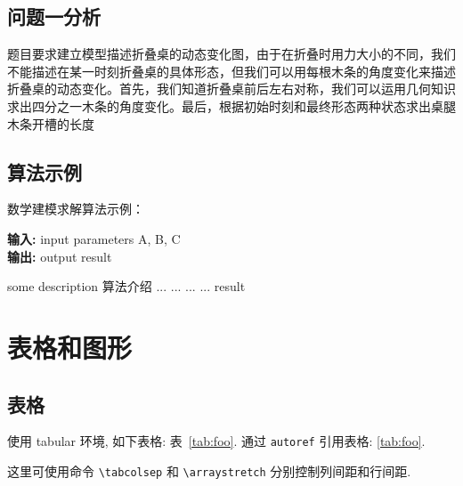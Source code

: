 \documentclass[bwprint]{gmcmthesis}
\begin{document}
\subsection{问题一分析}
题目要求建立模型描述折叠桌的动态变化图，由于在折叠时用力大小的不同，我们不能描述在某一时刻折叠桌的具体形态，但我们可以用每根木条的角度变化来描述折叠桌的动态变化。首先，我们知道折叠桌前后左右对称，我们可以运用几何知识求出四分之一木条的角度变化。最后，根据初始时刻和最终形态两种状态求出桌腿木条开槽的长度


\subsection{算法示例}

数学建模求解算法示例：
\begin{center}
\begin{minipage}{0.8\textwidth}
\begin{algorithm}[H]%
\caption{算法的名字} %
{\bf 输入:} %
input parameters A, B, C\\
{\bf 输出:} %
output result
\begin{algorithmic}[1]
\State some description 算法介绍 %
  \State ...
    \State ...
  \Else
    \State ...
  \EndIf
\EndFor
{} %
  \State ...
\EndWhile
\State \Return result
\end{algorithmic}
\end{algorithm}
\end{minipage}
\end{center}
\vspace{2ex}

\section{表格和图形}

\subsection{表格}

使用 tabular 环境, 如下表格: 表~\ref{tab:foo}. 通过 \verb|autoref| 引用表格: \autoref{tab:foo}.

这里可使用命令 \verb|\tabcolsep| 和 \verb|\arraystretch| 分别控制列间距和行间距.
\end{document}
